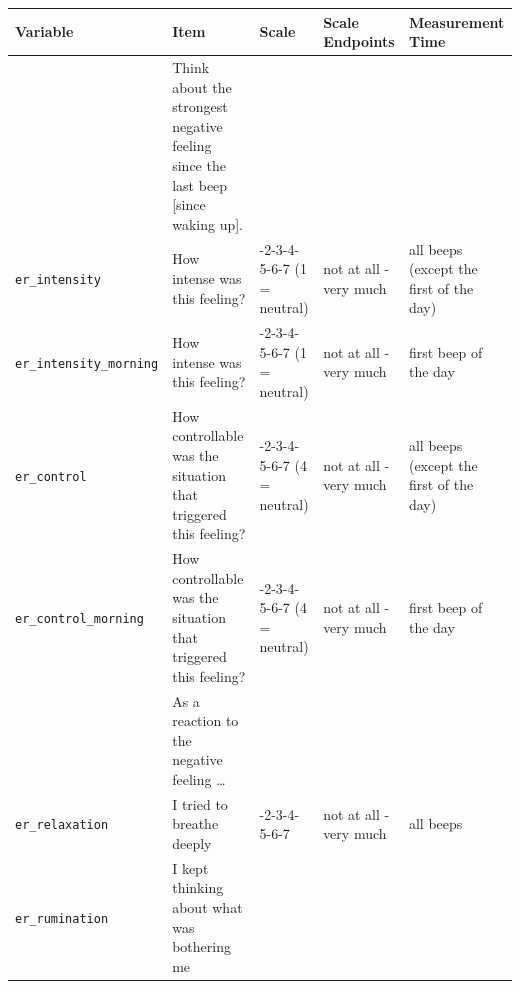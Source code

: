 \documentclass[
  letterpaper,
  DIV=11,
  numbers=noendperiod]{scrartcl}
\begin{document}
\begin{longtable}[]{@{}
  >{\raggedright\arraybackslash}p{}
  >{\raggedright\arraybackslash}p{}
  >{\raggedright\arraybackslash}p{}
  >{\raggedright\arraybackslash}p{}
  >{\raggedright\arraybackslash}p{}@{}}
\toprule\noalign{}
\begin{minipage}[b]{\linewidth}\raggedright
Variable
\end{minipage} & \begin{minipage}[b]{\linewidth}\raggedright
Item
\end{minipage} & \begin{minipage}[b]{\linewidth}\raggedright
Scale
\end{minipage} & \begin{minipage}[b]{\linewidth}\raggedright
Scale Endpoints
\end{minipage} & \begin{minipage}[b]{\linewidth}\raggedright
Measurement Time
\end{minipage} \\
\midrule\noalign{}
\endhead
\bottomrule\noalign{}
\endlastfoot
& Think about the strongest negative feeling since the last beep
{[}since waking up{]}. & & & \\
\texttt{er\_intensity} & How intense was this feeling? & 1-2-3-4-5-6-7
(1 = neutral) & not at all - very much & all beeps (except the first of
the day) \\
\texttt{er\_intensity\_morning} & How intense was this feeling? &
1-2-3-4-5-6-7 (1 = neutral) & not at all - very much & first beep of the
day \\
\texttt{er\_control} & How controllable was the situation that triggered
this feeling? & 1-2-3-4-5-6-7 (4 = neutral) & not at all - very much &
all beeps (except the first of the day) \\
\texttt{er\_control\_morning} & How controllable was the situation that
triggered this feeling? & 1-2-3-4-5-6-7 (4 = neutral) & not at all -
very much & first beep of the day \\
& As a reaction to the negative feeling \ldots{} & & & \\
\texttt{er\_relaxation} & I tried to breathe deeply & 1-2-3-4-5-6-7 &
not at all - very much & all beeps \\
\texttt{er\_rumination} & I kept thinking about what was bothering me &

\end{longtable}
\end{document}
